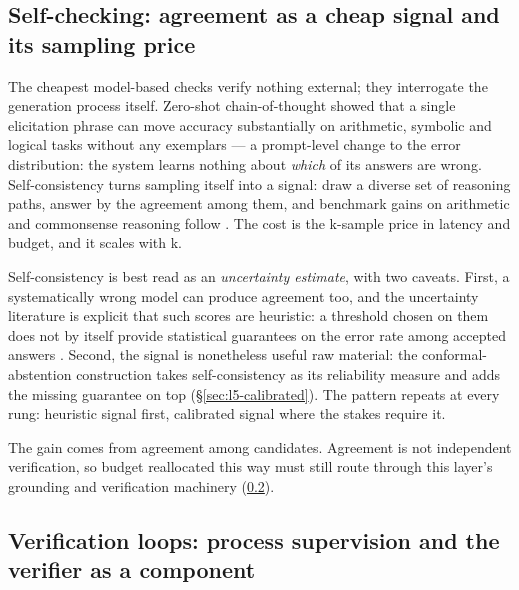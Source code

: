 \subsection{Self-checking: agreement as a cheap signal and its sampling price}
\label{sec:l5-selfcheck}

The cheapest model-based checks verify nothing external; they interrogate the generation process
itself. Zero-shot chain-of-thought showed that a single elicitation phrase can move accuracy
substantially on arithmetic, symbolic and logical tasks without any exemplars \cite{id220511916}
\evaurep{} --- a prompt-level change to the error distribution: the system learns nothing about
\emph{which} of its answers are wrong. Self-consistency turns sampling itself into a signal:
draw a diverse set of reasoning paths, answer by the agreement among them, and benchmark gains
on arithmetic and commonsense reasoning follow \cite{id220311171} \evaurep{}. The cost is the
k-sample price in latency and budget, and it scales with k.

Self-consistency is best read as an \emph{uncertainty estimate}, with two caveats. First, a
systematically wrong model can produce agreement too, and the
uncertainty literature is explicit that such scores are heuristic: a threshold chosen on them
does not by itself provide statistical guarantees on the error rate among accepted answers
\cite{id260704430}. Second, the signal is nonetheless useful raw material: the
conformal-abstention construction takes self-consistency as its reliability measure and adds
the missing guarantee on top (\S\ref{sec:l5-calibrated}). The pattern repeats at every rung:
heuristic signal first, calibrated signal where the stakes require it.

 The gain comes from agreement among
candidates. Agreement is not independent verification, so budget reallocated this way must
still route through this layer's grounding and verification machinery
(\cref{sec:l5-verifiers}).

\subsection{Verification loops: process supervision and the verifier as a component}
\label{sec:l5-verifiers}

